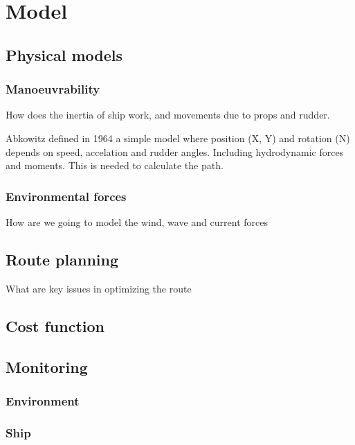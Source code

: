 \section{Model}

\subsection{Physical models}

\subsubsection{Manoeuvrability}
How does the inertia of ship work, and movements due to props and rudder.

Abkowitz defined in 1964 a simple model where position (X, Y) and rotation (N) depends on speed, accelation and rudder angles. Including hydrodynamic forces and moments. This is needed to calculate the path. 

\subsubsection{Environmental forces}
How are we going to model the wind, wave and current forces

\subsection{Route planning}
What are key issues in optimizing the route

\subsection{Cost function}

\subsection{Monitoring}
\subsubsection{Environment}

\subsubsection{Ship}